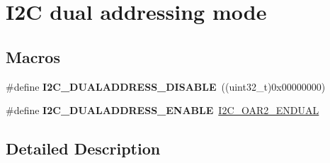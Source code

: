 \hypertarget{group___i2_c__dual__addressing__mode}{}\section{I2C dual addressing mode}
\label{group___i2_c__dual__addressing__mode}
\subsection*{Macros}
\begin{DoxyCompactItemize}
\item 
\#define {\bfseries I2\+C\+\_\+\+D\+U\+A\+L\+A\+D\+D\+R\+E\+S\+S\+\_\+\+D\+I\+S\+A\+B\+LE}~((uint32\+\_\+t)0x00000000)\hypertarget{group___i2_c__dual__addressing__mode_gacb8f4a1fd543e5ef2c9e7711fc9b5a67}{}\label{group___i2_c__dual__addressing__mode_gacb8f4a1fd543e5ef2c9e7711fc9b5a67}

\item 
\#define {\bfseries I2\+C\+\_\+\+D\+U\+A\+L\+A\+D\+D\+R\+E\+S\+S\+\_\+\+E\+N\+A\+B\+LE}~\hyperlink{group___peripheral___registers___bits___definition_gab83ed1ee64439cb2734a708445f37e94}{I2\+C\+\_\+\+O\+A\+R2\+\_\+\+E\+N\+D\+U\+AL}\hypertarget{group___i2_c__dual__addressing__mode_gae33ff5305d9f38d857cff1774f481fab}{}\label{group___i2_c__dual__addressing__mode_gae33ff5305d9f38d857cff1774f481fab}

\end{DoxyCompactItemize}


\subsection{Detailed Description}

